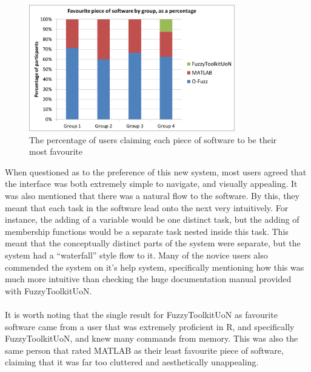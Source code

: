 \begin{figure}[ht!]
	\begin{center}
		\includegraphics[width=0.8\textwidth]{images/mostFav.png}
	\end{center}
	\vspace{-5mm}
	\captionsetup{justification=centering,margin=2cm}	
	\caption{The percentage of users claiming each piece of software to be their most favourite}
	\label{fig:mostLiked}
	\vspace{-2mm}
\end{figure}
\noindent 
When questioned as to the preference of this new system, most users agreed that the interface was both extremely simple to navigate, and visually appealing. It was also mentioned that there was a natural flow to the software. By this, they meant that each task in the software lead onto the next very intuitively. For instance, the adding of a variable would be one distinct task, but the adding of membership functions would be a separate task nested inside this task. This meant that the conceptually distinct parts of the system were separate, but the system had a ``waterfall'' style flow to it. Many of the novice users also commended the system on it's help system, specifically mentioning how this was much more intuitive than checking the huge documentation manual provided with FuzzyToolkitUoN.\ \\
\ \\
It is worth noting that the single result for FuzzyToolkitUoN as favourite software came from a user that was extremely proficient in R, and specifically FuzzyToolkitUoN, and knew many commands from memory. This was also the same person that rated MATLAB as their least favourite piece of software, claiming that it was far too cluttered and aesthetically unappealing.
	

